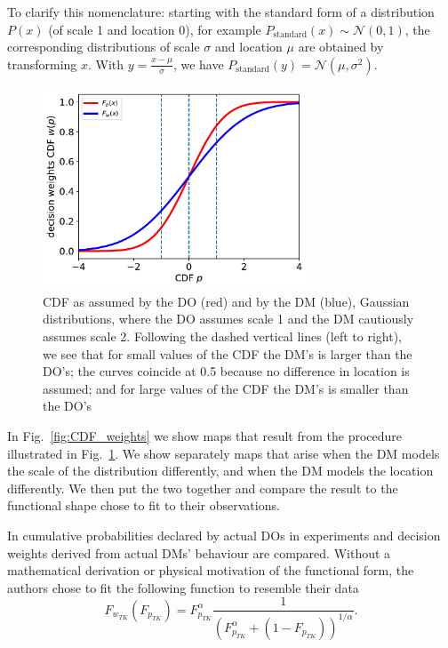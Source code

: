 \documentclass[11pt]{article}
\newcommand{\elabel}[1]{\label{eq:#1}}
\newcommand{\flabel}[1]{\label{fig:#1}}
\newcommand{\fref}[1]{Fig.~\ref{fig:#1}}
\newcommand{\be}{\begin{equation}}
\newcommand{\ee}{\end{equation}}
\newcommand{\ND}{\mathcal{N}} %
\numberwithin{equation}{section}
\begin{document}
To clarify this nomenclature: starting with the standard form of a distribution $P(x)$ (of scale 1 and location 0), for example $P_{\text{standard}}(x)\sim \ND(0,1)$, the corresponding distributions of scale $\sigma$ and location $\mu$ are obtained by transforming $x$. With $y=\frac{x-\mu}{\sigma}$, we have $P_{\text{standard}}(y)=\ND(\mu, \sigma^2)$.

\begin{figure}[!htb]
\centering
\includegraphics[width=0.7\textwidth]{./figs/decision_map.pdf}
\caption{CDF as assumed by the DO (red) and by the DM (blue), Gaussian distributions, where the DO assumes scale 1 and the DM cautiously assumes scale 2. Following the dashed vertical lines (left to right), we see that for small values of the CDF the DM's is larger than the DO's; the curves coincide at 0.5 because no difference in location is assumed; and for large values of the CDF the DM's is smaller than the DO's }
\flabel{decision_map}
\end{figure}

In \fref{CDF_weights} we show maps that result from the procedure illustrated in \fref{decision_map}. We show separately maps that arise when the DM models the scale of the distribution differently, and when the DM models the location differently. We then put the two together and compare the result to the functional shape \citet{TverskyKahneman1992} chose to fit to their observations.

In \citep{TverskyKahneman1992} cumulative probabilities declared by actual DOs in experiments and decision weights derived from actual DMs' behaviour are compared. Without a mathematical derivation or physical motivation of the functional form, the authors chose to fit the following function to resemble their data
\be
F_{w_{TK}}(F_{p_{TK}})=F_{p_{TK}}^\alpha \frac{1}{(F_{p_{TK}}^\alpha+(1-F_{p_{TK}}))^{1/\alpha}}.
\elabel{correspondence}
\ee
\end{document}
